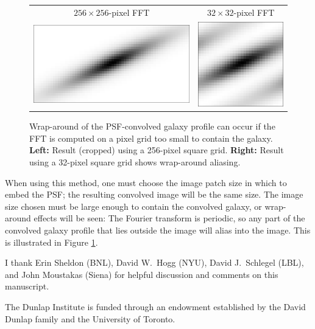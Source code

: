 \documentclass[11pt,preprint]{aastex}
\newcommand{\trick}{method}
\begin{document}
\begin{figure}
\begin{center}
\begin{tabular}{@{}cc@{}}
  $256 \times 256$-pixel FFT &
  $32 \times 32$-pixel FFT \\
  \includegraphics[height=0.22\textwidth]{gal-00} &
  \includegraphics[height=0.22\textwidth]{gal-01} \\
\end{tabular}
\end{center}
\caption{\label{fig:wrap}%
  Wrap-around of the PSF-convolved galaxy profile can occur if the FFT is
  computed on a pixel grid too small to contain the galaxy.
  \textbf{Left:} Result (cropped) using a 256-pixel square grid.
  \textbf{Right:} Result using a 32-pixel square grid shows wrap-around
  aliasing.
}
\end{figure}

When using this \trick, one must choose the image patch size in which
to embed the PSF; the resulting convolved image will be the same size.
The image size chosen must be large enough to contain the convolved
galaxy, or wrap-around effects will be seen: The Fourier transform is
periodic, so any part of the convolved galaxy profile that lies
outside the image will alias into the image.  This is
illustrated in Figure \ref{fig:wrap}.



\acknowledgements

I thank Erin Sheldon (BNL),
David W.~Hogg (NYU), David J.~Schlegel (LBL), and John Moustakas (Siena)
for helpful discussion and comments on this manuscript.

The Dunlap Institute is funded through an endowment established by the
David Dunlap family and the University of Toronto.




\appendix
\end{document}
